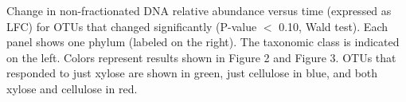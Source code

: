Change in non-fractionated DNA relative abundance versus time (expressed
as LFC) for OTUs that changed significantly (P-value $<$ 0.10, Wald test).
Each panel shows one phylum (labeled on the right). The taxonomic class is
indicated on the left. Colors represent results shown in Figure 2 and
Figure 3.  OTUs that responded to just xylose are shown in 
green, just cellulose in blue, and both xylose and cellulose in red.  

